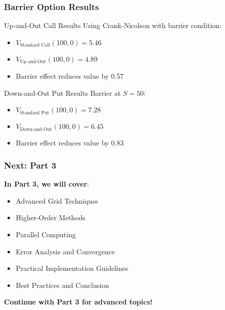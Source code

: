 \documentclass[aspectratio=169]{beamer}
\begin{document}
\begin{frame}
\frametitle{Barrier Option Results}
\begin{block}{Up-and-Out Call Results}
Using Crank-Nicolson with barrier condition:
\begin{itemize}
\item \(V_{\text{Standard Call}}(100, 0) = 5.46\)
\item \(V_{\text{Up-and-Out}}(100, 0) = 4.89\)
\item Barrier effect reduces value by 0.57
\end{itemize}
\end{block}

\begin{block}{Down-and-Out Put Results}
Barrier at \(S = 50\):
\begin{itemize}
\item \(V_{\text{Standard Put}}(100, 0) = 7.28\)
\item \(V_{\text{Down-and-Out}}(100, 0) = 6.45\)
\item Barrier effect reduces value by 0.83
\end{itemize}
\end{block}
\end{frame}

\begin{frame}
\frametitle{Next: Part 3}
\textbf{In Part 3, we will cover}:
\begin{itemize}
\item Advanced Grid Techniques
\item Higher-Order Methods
\item Parallel Computing
\item Error Analysis and Convergence
\item Practical Implementation Guidelines
\item Best Practices and Conclusion
\end{itemize}

\textbf{Continue with Part 3 for advanced topics!}
\end{frame}
\end{document}
